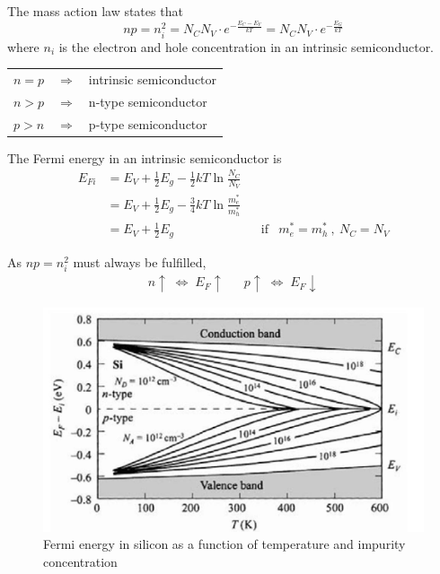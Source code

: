 The mass action law states that
\begin{equation}
    n p = n_i^2 = N_C N_V \cdot e^{-\frac{E_C-E_V}{k T}} = N_C N_V \cdot e^{-\frac{E_G}{k T}}
\end{equation}
where $n_i$ is the electron and hole concentration in an intrinsic semiconductor.

\begin{table}[h!]
    \centering
    \begin{tabular}{lll}
        $n = p$ & $\Rightarrow$ & intrinsic semiconductor \\
        $n > p$ & $\Rightarrow$ & n-type semiconductor \\
        $p > n$ & $\Rightarrow$ & p-type semiconductor \\
    \end{tabular}
\end{table}

The Fermi energy in an intrinsic semiconductor is
\begin{align}
    E_{Fi} &= E_V + \frac{1}{2} E_g - \frac{1}{2} k T \ln \frac{N_C}{N_V} \\
    &= E_V + \frac{1}{2} E_g - \frac{3}{4} k T \ln \frac{m_e^*}{m_h^*} \\
    &= E_V + \frac{1}{2} E_g && \text{if} & m_e^*=m_h^* \:,\: N_C = N_V
\end{align}

As $np = n_i^2$ must always be fulfilled,
\begin{align*}
    n \uparrow \;\Leftrightarrow\; E_F \uparrow && p \uparrow \;\Leftrightarrow\; E_F \downarrow
\end{align*}

\begin{figure}[htbp]
    \centering
    \includegraphics[width=0.6\linewidth]{images/semiconductors_fermi_energies.jpg}
    \caption{Fermi energy in silicon as a function of temperature and impurity concentration}
\end{figure}